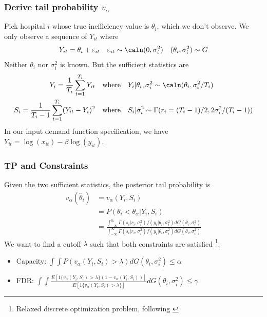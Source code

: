 \documentclass[10pt,mathserif,aspectratio=169]{beamer}
\begin{document}
\begin{frame}[label=observation]
  \frametitle{Derive tail probability $v_\alpha$}
  Pick hospital $i$ whose true inefficiency value is $\theta_i$, which we don't observe. We only observe a sequence of $Y_{it}$ where
  \begin{equation*}
    Y_{it} = \theta_i + \varepsilon_{it} \quad \varepsilon_{it} \sim \caln(0,\sigma_i^2) \quad (\theta_i,\sigma_i^2) \sim G
  \end{equation*}
  Neither $\theta_i$ nor $\sigma_i^2$ is known. But the sufficient statistics are
  \begin{align*}
    Y_i=\frac{1}{T_i}\sum_{t=1}^{T_i}Y_{it}           & \quad \text{where}\quad Y_i|\theta_i,\sigma_i^2 \sim \caln(\theta_i,\sigma_i^2/T_i)     \\
    S_i=\frac{1}{T_i-1}\sum_{t=1}^{T_i}(Y_{it}-Y_i)^2 & \quad \text{where} \quad S_i|\sigma_i^2 \sim \Gamma(r_i= (T_i-1)/2,2\sigma_i^2/(T_i-1))
  \end{align*}
  In our input demand function specification, we have $Y_{it}=\log(x_{it})-\beta\log(y_{it})$. \hyperlink{normality}{}
\end{frame}

\begin{frame}
  \frametitle{TP and Constraints}
  Given the two sufficient statistics, the posterior tail probability is
  \begin{align*}
    v_\alpha(\hat{\theta}_i) & =v_\alpha(Y_i,S_i)                                                                                                         \\
                             & = P( \theta_i < \theta_{\alpha} | Y_i,S_i)                                                                                 \\
                             & = \frac{{\int_{-\infty}^{\theta_{\alpha}} \Gamma(s_i|r_i,\sigma_i^2) f(y_i|\theta_i, \sigma_i^2) dG(\theta_i,\sigma_i^2)}}
    {{\int_{-\infty}^{\infty} \Gamma(s_i|r_i,\sigma_i^2) f(y_i|\theta_i, \sigma_i^2) dG(\theta_i,\sigma_i^2)}}
  \end{align*}
  We want to find a cutoff $\lambda$ such that both constraints are satisfied \footnote{Relaxed discrete optimization problem, following \citep{basu2018weighted}}:\\
  \begin{itemize}\itemsep=8pt
    \item Capacity: $\int \int P(v_\alpha(Y_i, S_i) > \lambda) dG(\theta_i,\sigma_i^2)
            \leq \alpha$
    \item FDR: $\int \int
            \frac{E[1\{v_\alpha(Y_i,S_i)>\lambda\}(1-v_\alpha(Y_i,S_i))]}{E[1\{v_\alpha(Y_i,S_i)>\lambda\}]}
            dG(\theta_i,\sigma_i^2) \leq \gamma$
  \end{itemize}
\end{frame}
\end{document}
